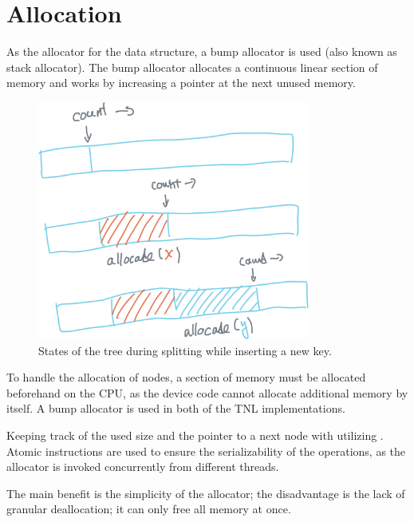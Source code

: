 \section{Allocation}

As the allocator for the data structure, a bump allocator is used (also known as stack allocator). The bump allocator allocates a continuous linear section of memory and works by increasing a pointer at the next unused memory.

\begin{figure}
  \centering
  \includegraphics[width=0.8\textwidth ]{components/figure/bump-allocator}
  \caption{States of the tree during splitting while inserting a new key.}
  \label{figure:bump-allocator}
\end{figure}

To handle the allocation of nodes, a section of memory must be allocated beforehand on the CPU, as the device code cannot allocate additional memory by itself. A bump allocator is used in both of the TNL implementations.

Keeping track of the used size and the pointer to a next node with utilizing . Atomic instructions are used to ensure the serializability of the operations, as the allocator is invoked concurrently from different threads.

The main benefit is the simplicity of the allocator; the disadvantage is the lack of granular deallocation; it can only free all memory at once.
